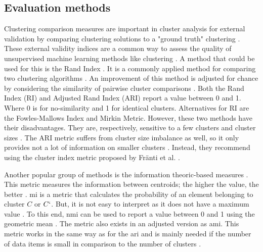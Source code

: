 \subsection{Evaluation methods} \label{theory:evaluate}
Clustering comparison measures are important in cluster analysis for external validation by comparing clustering solutions to a "ground truth" clustering \citep{vinh_information_nodate}.
These external validity indices are a common way to assess the quality of unsupervised machine learning methods like clustering \citep{warrens_understanding_2022}.
A method that could be used for this is the Rand Index \citep{rand_objective_1971}.
It is a commonly applied method for comparing two clustering algorithms \citep{wagner_comparing_nodate}.
An improvement of this method is adjusted for chance by considering the similarity of pairwise cluster comparisons \citep{vinh_information_nodate}.
Both the Rand Index (RI) and Adjusted Rand Index (ARI) \citep{hubert_comparing_1985} report a value between 0 and 1.
Where 0 is for no-similarity and 1 for identical clusters.
Alternatives for RI are the Fowles-Mallows Index and Mirkin Metric.
However, these two methods have their disadvantages. They are, respectively, sensitive to a few clusters and cluster sizes \citep{wagner_comparing_nodate}.
The ARI metric suffers from cluster size imbalance as well, so it only provides not a lot of information on smaller clusters \citep{warrens_understanding_2022}.
Instead, they recommend using the cluster index metric proposed by Fränti et al. \citep{franti_centroid_2014}.

Another popular group of methods is the information theoric-based measures \citep{vinh_information_nodate}.
This metric measures the information between centroids; the higher the value, the better \citep{vinh_information_nodate}.
\gls{mi} is a metric that calculates the probability of an element belonging to cluster $C$ or $C`$.
But, it is not easy to interpret as it does not have a maximum value \citep{wagner_comparing_nodate}.
To this end, \gls{nmi} can be used to report a value between 0 and 1 using the geometric mean \citep{strehl_cluster_2002}.
The metric also exists in an adjusted version as \gls{ami}.
This metric works in the same way as for the \gls{ari} and is mainly needed if the number of data items is small in comparison to the number of clusters \citep{vinh_information_nodate}. \newline

